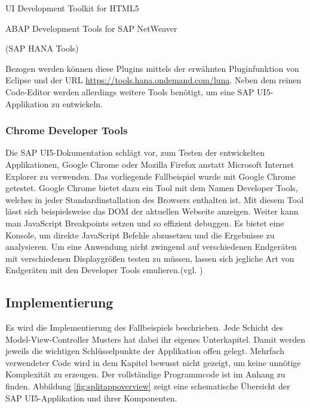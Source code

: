 \vspace{1em}
\begin{compactitem}
  \item UI Development Toolkit for HTML5
  \item ABAP Development Tools for SAP NetWeaver
  \item (SAP HANA Tools)
\end{compactitem}
\vspace{1em}

Bezogen werden können diese Plugins mittels der erwähnten Pluginfunktion von Eclipse und der URL \url{https://tools.hana.ondemand.com/luna}. Neben dem reinen Code-Editor werden allerdings weitere Tools benötigt, um eine SAP UI5-Applikation zu entwickeln.

\subsubsection{Chrome Developer Tools}
Die SAP UI5-Dokumentation schlägt vor, zum Testen der entwickelten Applikationen, Google Chrome oder Mozilla Firefox anstatt Microsoft Internet Explorer zu verwenden. Das vorliegende Fallbeispiel wurde mit Google Chrome getestet. Google Chrome bietet dazu ein Tool mit dem Namen Developer Tools, welches in jeder Standardinstallation des Browsers enthalten ist. Mit diesem Tool lässt sich beispielsweise das DOM der aktuellen Webseite anzeigen. Weiter kann man JavaScript Breakpoints setzen und so effizient debuggen. Es bietet eine Konsole, um direkte JavaScript Befehle abzusetzen und die Ergebnisse zu analysieren. Um eine Anwendung nicht zwingend auf verschiedenen Endgeräten mit verschiedenen Displaygrößen testen zu müssen, lassen sich jegliche Art von Endgeräten mit den Developer Tools emulieren.(vgl. \cite{DevTools})



\subsection{Implementierung}
Es wird die Implementierung des Fallbeispiels beschrieben. Jede Schicht des Model-View-Controller Musters hat dabei ihr eigenes Unterkapitel. Damit werden jeweils die wichtigen Schlüsselpunkte der Applikation offen gelegt. Mehrfach verwendeter Code wird in dem Kapitel bewusst nicht gezeigt, um keine unnötige Komplexität zu erzeugen. Der vollständige Programmcode ist im Anhang zu finden. Abbildung \ref{fig:splitappoverview} zeigt eine schematische Übersicht der SAP UI5-Applikation und ihrer Komponenten.

